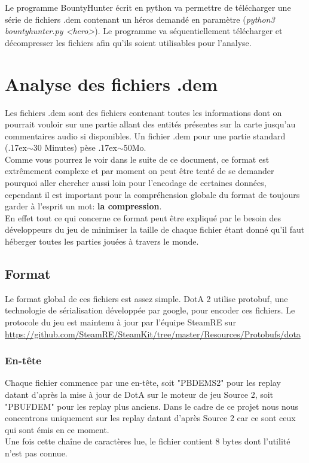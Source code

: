 \documentclass{article}
\begin{document}
Le programme BountyHunter écrit en python va permettre de télécharger une série de fichiers .dem contenant un héros demandé en paramètre (\textit{python3 bountyhunter.py <hero>}). Le programme va séquentiellement télécharger et décompresser les fichiers afin qu'ils soient utilisables pour l'analyse.

\section{Analyse des fichiers .dem}

Les fichiers .dem sont des fichiers contenant toutes les informations dont on pourrait vouloir sur une partie allant des entités présentes sur la carte jusqu'au commentaires audio si disponibles. Un fichier .dem pour une partie standard ({\raise.17ex\hbox{$\scriptstyle\mathtt{\sim}$}}30 Minutes) pèse {\raise.17ex\hbox{$\scriptstyle\mathtt{\sim}$}}50Mo.\\
Comme vous pourrez le voir dans le suite de ce document, ce format est extrêmement complexe et par moment on peut être tenté de se demander pourquoi aller chercher aussi loin pour l'encodage de certaines données, cependant il est important pour la compréhension globale du format de toujours garder à l'esprit un mot: \textbf{la compression}.\\
En effet tout ce qui concerne ce format peut être expliqué par le besoin des développeurs du jeu de minimiser la taille de chaque fichier étant donné qu'il faut héberger toutes les parties jouées à travers le monde. 

\subsection{Format}

Le format global de ces fichiers est assez simple. DotA 2 utilise protobuf, une technologie de sérialisation développée par google, pour encoder ces fichiers. Le protocole du jeu est maintenu à jour par l'équipe SteamRE sur \url{https://github.com/SteamRE/SteamKit/tree/master/Resources/Protobufs/dota} \\

\subsubsection{En-tête}
Chaque fichier commence par une en-tête, soit "PBDEMS2" pour les replay datant d'après la mise à jour de DotA sur le moteur de jeu Source 2, soit "PBUFDEM" pour les replay plus anciens. Dans le cadre de ce projet nous nous concentrons uniquement sur les replay datant d'après Source 2 car ce sont ceux qui sont émis en ce moment.\\
Une fois cette chaîne de caractères lue, le fichier contient 8 bytes dont l'utilité n'est pas connue.\\
\end{document}
